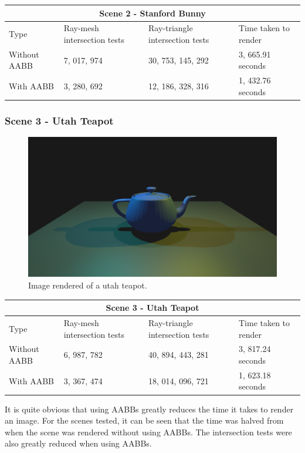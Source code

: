 \documentclass[11pt,a4paper]{article}
\begin{document}
	\begin{table}[h]
		\centering
		\begin{tabular}{ |p{3cm}||p{3cm}|p{3cm}|p{3cm}|  }
			\hline
			\multicolumn{4}{|c|}{Scene 2 - Stanford Bunny} \\
			\hline
			Type   &   Ray-mesh intersection tests  & Ray-triangle intersection tests &   Time taken to render\\
			\hline
			Without AABB   & 7, 017, 974 & 30, 753, 145, 292&   3, 665.91 seconds\\
			With AABB&   3, 280, 692 & 12, 186, 328, 316  &       1, 432.76 seconds\\
			\hline
		\end{tabular}
	\end{table}

	\subsubsection{Scene 3 - Utah Teapot}
	\begin{figure}[H]
		\centering
		\captionsetup{justification=centering}
		\includegraphics[width=.5\textwidth]{teapotscene}\quad
		\caption{Image rendered of a utah teapot.}
	\end{figure}
	
	\begin{table}[h]
		\centering
		\begin{tabular}{ |p{3cm}||p{3cm}|p{3cm}|p{3cm}|  }
			\hline
			\multicolumn{4}{|c|}{Scene 3 - Utah Teapot} \\
			\hline
			Type   &   Ray-mesh intersection tests  & Ray-triangle intersection tests &   Time taken to render\\
			\hline
			Without AABB   & 6, 987, 782   &40, 894, 443, 281&   3, 817.24 seconds\\
			With AABB&   3, 367, 474 & 18, 014, 096, 721   &       1, 623.18 seconds\\
			\hline
		\end{tabular}
	\end{table}

	\noindent
	It is quite obvious that using AABBs greatly reduces the time it takes to render an image. For the scenes tested, it can be seen that the time was halved from when the scene was rendered without using AABBs. The intersection tests were also greatly reduced when using AABBs.
	
\end{document}
